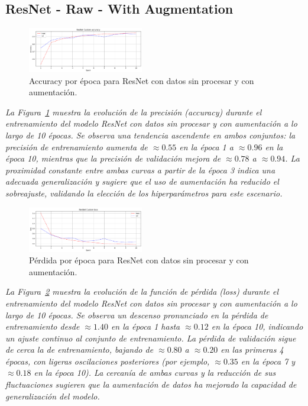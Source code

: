 \documentclass[conference]{IEEEtran}
\begin{document}
\subsection{ResNet - Raw - With Augmentation}

\begin{figure}[H]
    \centering
    \includegraphics[width=0.45\textwidth]{graphics-resnet-raw/resnet_raw_with_accuracy.png}
    \caption{Accuracy por época para ResNet con datos sin procesar y con aumentación.}
    \label{fig:resnet_raw_with_accuracy}
\end{figure}
\noindent\textit{%
La Figura~\ref{fig:resnet_raw_with_accuracy} muestra la evolución de la precisión (accuracy) durante el entrenamiento del modelo ResNet con datos sin procesar y con aumentación a lo largo de 10 épocas. Se observa una tendencia ascendente en ambos conjuntos: la precisión de entrenamiento aumenta de \(\approx0.55\) en la época 1 a \(\approx0.96\) en la época 10, mientras que la precisión de validación mejora de \(\approx0.78\) a \(\approx0.94\). La proximidad constante entre ambas curvas a partir de la época 3 indica una adecuada generalización y sugiere que el uso de aumentación ha reducido el sobreajuste, validando la elección de los hiperparámetros para este escenario.%
}

\begin{figure}[H]
    \centering
    \includegraphics[width=0.45\textwidth]{graphics-resnet-raw/resnet_raw_with_loss.png}
    \caption{Pérdida por época para ResNet con datos sin procesar y con aumentación.}
    \label{fig:resnet_raw_with_loss}
\end{figure}
\noindent\textit{%
La Figura~\ref{fig:resnet_raw_with_loss} muestra la evolución de la función de pérdida (loss) durante el entrenamiento del modelo ResNet con datos sin procesar y con aumentación a lo largo de 10 épocas. Se observa un descenso pronunciado en la pérdida de entrenamiento desde \(\approx1.40\) en la época 1 hasta \(\approx0.12\) en la época 10, indicando un ajuste continuo al conjunto de entrenamiento. La pérdida de validación sigue de cerca la de entrenamiento, bajando de \(\approx0.80\) a \(\approx0.20\) en las primeras 4 épocas, con ligeras oscilaciones posteriores (por ejemplo, \(\approx0.35\) en la época 7 y \(\approx0.18\) en la época 10). La cercanía de ambas curvas y la reducción de sus fluctuaciones sugieren que la aumentación de datos ha mejorado la capacidad de generalización del modelo.%
}
\end{document}
